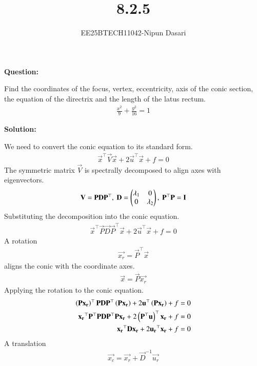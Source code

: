 \documentclass[journal]{IEEEtran}
\begin{document}
	
	\title{8.2.5}
	\author{EE25BTECH11042-Nipun Dasari}
	\maketitle
	
	\textbf{Question:}
	
	Find the coordinates of the focus, vertex, eccentricity, axis of the conic section, the equation of the directrix and the length of the latus rectum.
	\begin{align*}
		\frac{x^2}{9} + \frac{y^2}{16} = 1
	\end{align*}
	
	\textbf{Solution:}
	
	We need to convert the conic equation to its standard form.
	\begin{align*}
		\vec{x}^\top\vec{V}\vec{x} + 2\vec{u}^\top\vec{x} + f = 0
	\end{align*}
	The symmetric matrix $\vec{V}$ is spectrally decomposed to align axes with eigenvectors.
	\begin{align}
		\mathbf{V} = \mathbf{P}\mathbf{D}\mathbf{P}^\top, \text{ } \mathbf{D} = \begin{pmatrix}\lambda_1 & 0 \\ 0 & \lambda_2\end{pmatrix}, \text{ } \mathbf{P}^\top\mathbf{P} = \mathbf{I}
	\end{align}
	Substituting the decomposition into the conic equation.
	\begin{align}
		\vec{x}^\top\vec{P}\vec{D}\vec{P}^\top\vec{x} + 2\vec{u}^\top\vec{x} + f = 0
	\end{align}
	A rotation
	\begin{align}
		\vec{x_r} = \vec{P}^\top\vec{x} 
	\end{align}
	aligns the conic with the coordinate axes.
	\begin{align}
		\vec{x} = \vec{P}\vec{x_r}
	\end{align}
	Applying the rotation to the conic equation.
	\begin{align}
		\left(\mathbf{P}\mathbf{x_r}\right)^\top\mathbf{P}\mathbf{D}\mathbf{P}^\top\left(\mathbf{P}\mathbf{x_r}\right) + 2\mathbf{u}^\top\left(\mathbf{P}\mathbf{x_r}\right) + f &= 0 \\
		\mathbf{x_r}^\top\mathbf{P}^\top\mathbf{P}\mathbf{D}\mathbf{P}^\top\mathbf{P}\mathbf{x_r} + 2\left(\mathbf{P}^\top\mathbf{u}\right)^\top\mathbf{x_r} + f &= 0 \\
		\mathbf{x_r}^\top\mathbf{D}\mathbf{x_r} + 2\mathbf{u_r}^\top\mathbf{x_r} + f &= 0
	\end{align}
	A translation 
	\begin{align}
		\vec{x_c} = \vec{x_r} + \vec{D}^{-1}\vec{u_r}
	\end{align}
\end{document}
